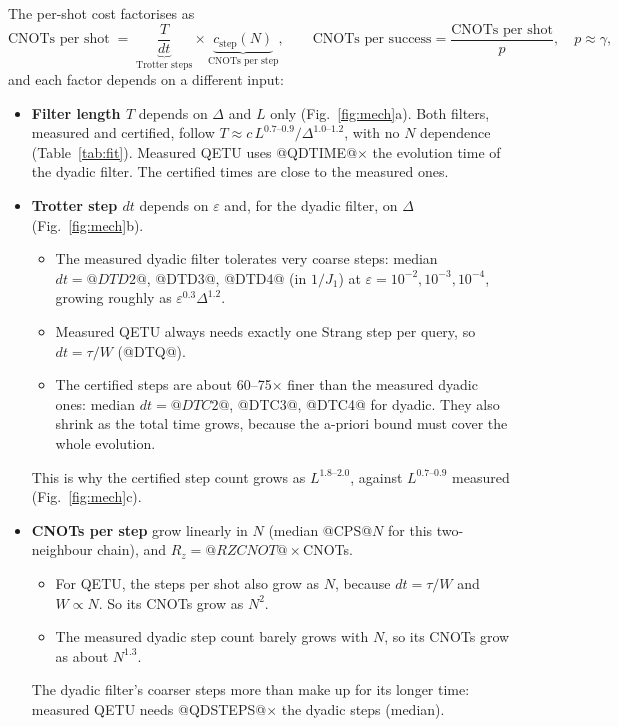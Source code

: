 \documentclass[10pt]{article}
\begin{document}
The per-shot cost factorises as
\begin{equation}
\text{CNOTs per shot}\;=\;\underbrace{\frac{T}{dt}}_{\text{Trotter steps}}\times\underbrace{c_\text{step}(N)}_{\text{CNOTs per step}},
\qquad
\text{CNOTs per success}=\frac{\text{CNOTs per shot}}{p},\quad p\approx\gamma,
\end{equation}
and each factor depends on a different input:
\begin{itemize}
\item \textbf{Filter length $T$} depends on $\Delta$ and $L$ only (Fig.~\ref{fig:mech}a). Both filters, measured
and certified, follow $T\approx c\,L^{0.7\text{--}0.9}/\Delta^{1.0\text{--}1.2}$, with no $N$ dependence
(Table~\ref{tab:fit}). Measured QETU uses @QDTIME@$\times$ the evolution time of the dyadic filter. The certified
times are close to the measured ones.
\item \textbf{Trotter step $dt$} depends on $\varepsilon$ and, for the dyadic filter, on $\Delta$
(Fig.~\ref{fig:mech}b).
  \begin{itemize}
  \item The measured dyadic filter tolerates very coarse steps: median $dt=@DTD2@$, @DTD3@, @DTD4@ (in $1/J_1$) at
  $\varepsilon=10^{-2},10^{-3},10^{-4}$, growing roughly as $\varepsilon^{0.3}\Delta^{1.2}$.
  \item Measured QETU always needs exactly one Strang step per query, so $dt=\tau/W$ (@DTQ@).
  \item The certified steps are about 60--75$\times$ finer than the measured dyadic ones: median $dt=@DTC2@$, @DTC3@, @DTC4@ for dyadic. They also
  shrink as the total time grows, because the a-priori bound must cover the whole evolution.
  \end{itemize}
  This is why the certified step count grows as $L^{1.8\text{--}2.0}$, against $L^{0.7\text{--}0.9}$ measured
  (Fig.~\ref{fig:mech}c).
\item \textbf{CNOTs per step} grow linearly in $N$ (median @CPS@$N$ for this two-neighbour chain), and
$R_z=@RZCNOT@\times$CNOTs.
  \begin{itemize}
  \item For QETU, the steps per shot also grow as $N$, because $dt=\tau/W$ and $W\propto N$. So its CNOTs grow as
  $N^{2}$.
  \item The measured dyadic step count barely grows with $N$, so its CNOTs grow as about $N^{1.3}$.
  \end{itemize}
  The dyadic filter's coarser steps more than make up for its longer time: measured QETU needs @QDSTEPS@$\times$
  the dyadic steps (median).
\end{itemize}
\end{document}
